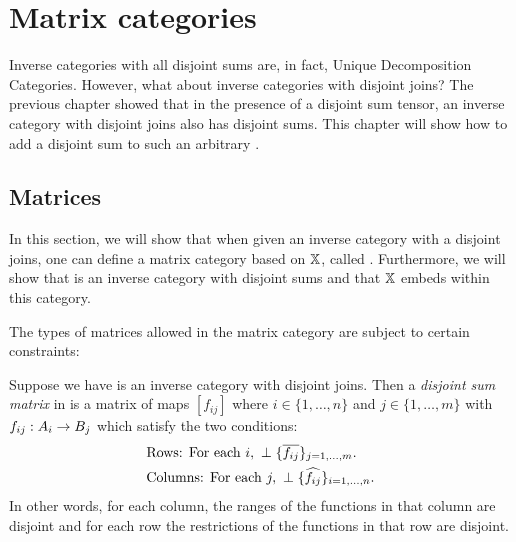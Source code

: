 \chapter{Matrix categories} %
\label{cha:matrix_categories}

Inverse categories with all disjoint sums are, in fact, Unique Decomposition
Categories\cite{haghverdi:2000phd}. However, what about inverse categories with disjoint joins?
The previous chapter showed that in the presence of a disjoint sum tensor, an inverse category \X
with disjoint joins also has disjoint sums. This chapter will show how to add a disjoint sum to
such an arbitrary \X.



\section{Matrices} %
\label{sec:matrix_representation}
In this section, we will show that when given an inverse  category \X with a disjoint joins, one
can define a matrix category based on $\mathbb{X}$, called \imatx. Furthermore, we will show that \imatx is
an inverse category with disjoint sums and that $\mathbb{X}$ embeds within this category.

The types of matrices allowed in the matrix category are subject to certain constraints:
\begin{definition}\label{def:disjoint_sum_matrix}
  Suppose we have \X is an inverse category with disjoint joins. Then a \emph{disjoint sum matrix}
  in \X is a matrix of maps $[f_{i j}]$ where $i \in \{1,\ldots, n\}$ and $j \in \{1,\ldots, m\}$ with
  $f_{ij}:A_i \to B_j$ which satisfy the two conditions:
  \begin{align}
    &\text{Rows: For each }i,\ \perp\{\overline{f_{i j}}\}_{j=1,\ldots,m}.
      \label{eq:disjoint_sum_matrix_row_perp}\\
    &\text{Columns: For each }j,\ \perp\{\widehat{f_{i j}}\}_{i=1,\ldots,n}.
    \label{eq:disjoint_sum_matrix_column_perp}
  \end{align}
  In other words, for each column, the ranges of the functions in that column are disjoint and for
  each row the restrictions of the functions in that row are disjoint.
\end{definition}


